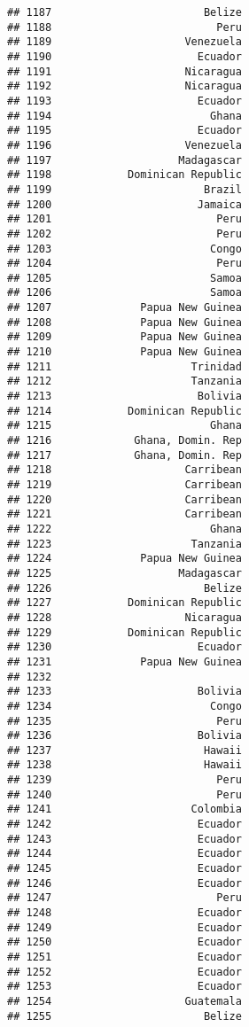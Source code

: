 \documentclass[
]{article}
\begin{document}
\begin{verbatim}
## 1187                        Belize
## 1188                          Peru
## 1189                     Venezuela
## 1190                       Ecuador
## 1191                     Nicaragua
## 1192                     Nicaragua
## 1193                       Ecuador
## 1194                         Ghana
## 1195                       Ecuador
## 1196                     Venezuela
## 1197                    Madagascar
## 1198            Dominican Republic
## 1199                        Brazil
## 1200                       Jamaica
## 1201                          Peru
## 1202                          Peru
## 1203                         Congo
## 1204                          Peru
## 1205                         Samoa
## 1206                         Samoa
## 1207              Papua New Guinea
## 1208              Papua New Guinea
## 1209              Papua New Guinea
## 1210              Papua New Guinea
## 1211                      Trinidad
## 1212                      Tanzania
## 1213                       Bolivia
## 1214            Dominican Republic
## 1215                         Ghana
## 1216             Ghana, Domin. Rep
## 1217             Ghana, Domin. Rep
## 1218                     Carribean
## 1219                     Carribean
## 1220                     Carribean
## 1221                     Carribean
## 1222                         Ghana
## 1223                      Tanzania
## 1224              Papua New Guinea
## 1225                    Madagascar
## 1226                        Belize
## 1227            Dominican Republic
## 1228                     Nicaragua
## 1229            Dominican Republic
## 1230                       Ecuador
## 1231              Papua New Guinea
## 1232                              
## 1233                       Bolivia
## 1234                         Congo
## 1235                          Peru
## 1236                       Bolivia
## 1237                        Hawaii
## 1238                        Hawaii
## 1239                          Peru
## 1240                          Peru
## 1241                      Colombia
## 1242                       Ecuador
## 1243                       Ecuador
## 1244                       Ecuador
## 1245                       Ecuador
## 1246                       Ecuador
## 1247                          Peru
## 1248                       Ecuador
## 1249                       Ecuador
## 1250                       Ecuador
## 1251                       Ecuador
## 1252                       Ecuador
## 1253                       Ecuador
## 1254                     Guatemala
## 1255                        Belize

\end{verbatim}
\end{document}

